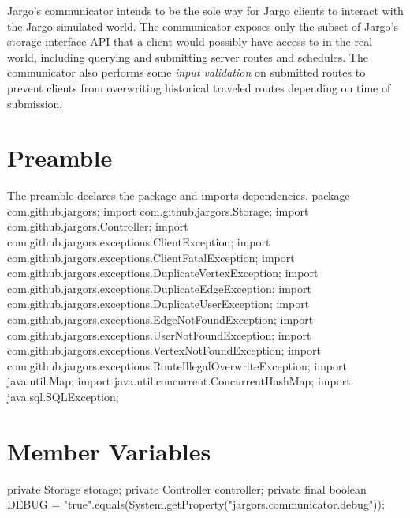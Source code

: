 Jargo's communicator intends to be the sole way for Jargo clients to interact
with the Jargo simulated world. The communicator exposes only the subset of
Jargo's storage interface API that a client would possibly have access to in
the real world, including querying and submitting server routes and schedules.
The communicator also performs some \emph{input validation} on submitted routes
to prevent clients from overwriting historical traveled routes depending on
time of submission.

\section{Preamble}
The preamble declares the package and imports dependencies.
\nwenddocs{}\endmoddef{}
package com.github.jargors;
\nwendcode{}\nwdocspar
\nwenddocs{}\plusendmoddef
import com.github.jargors.Storage;
import com.github.jargors.Controller;
import com.github.jargors.exceptions.ClientException;
import com.github.jargors.exceptions.ClientFatalException;
import com.github.jargors.exceptions.DuplicateVertexException;
import com.github.jargors.exceptions.DuplicateEdgeException;
import com.github.jargors.exceptions.DuplicateUserException;
import com.github.jargors.exceptions.EdgeNotFoundException;
import com.github.jargors.exceptions.UserNotFoundException;
import com.github.jargors.exceptions.VertexNotFoundException;
import com.github.jargors.exceptions.RouteIllegalOverwriteException;
import java.util.Map;
import java.util.concurrent.ConcurrentHashMap;
import java.sql.SQLException;
\nwendcode{}\nwdocspar

\section{Member Variables}
\nwenddocs{}\endmoddef{}
private Storage storage;
private Controller controller;
private final boolean DEBUG = "true".equals(System.getProperty("jargors.communicator.debug"));
\nwendcode{}\nwdocspar

